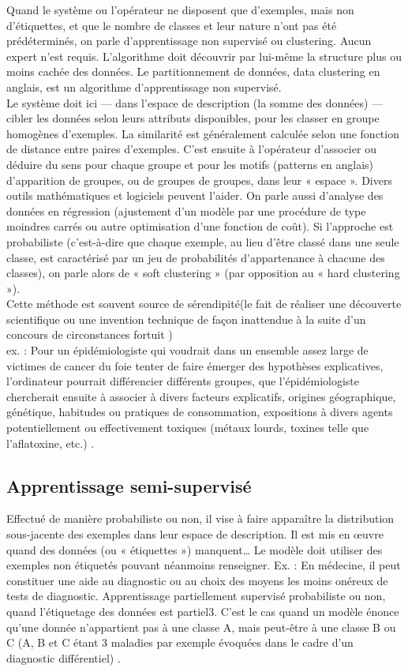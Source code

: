 \documentclass[12pt, french]{report}
\begin{document}
Quand le système ou l'opérateur ne disposent que d'exemples, mais non d'étiquettes, et que le nombre de classes et leur nature n'ont pas été prédéterminés, on parle d'apprentissage non supervisé ou clustering. Aucun expert n'est requis. L'algorithme doit découvrir par lui-même la structure plus ou moins cachée des données. Le partitionnement de données, data clustering en anglais, est un algorithme d'apprentissage non supervisé.\\
Le système doit ici — dans l'espace de description (la somme des données) — cibler les données selon leurs attributs disponibles, pour les classer en groupe homogènes d'exemples. La similarité est généralement calculée selon une fonction de distance entre paires d'exemples. C'est ensuite à l'opérateur d'associer ou déduire du sens pour chaque groupe et pour les motifs (patterns en anglais) d'apparition de groupes, ou de groupes de groupes, dans leur « espace ». Divers outils mathématiques et logiciels peuvent l'aider. On parle aussi d'analyse des données en régression (ajustement d'un modèle par une procédure de type moindres carrés ou autre optimisation d'une fonction de coût). Si l'approche est probabiliste (c'est-à-dire que chaque exemple, au lieu d'être classé dans une seule classe, est caractérisé par un jeu de probabilités d'appartenance à chacune des classes), on parle alors de « soft clustering » (par opposition au « hard clustering »).\\
Cette méthode est souvent source de sérendipité(le fait de réaliser une découverte scientifique ou une invention technique de façon inattendue à la suite d'un concours de circonstances fortuit )\\
ex. : Pour un épidémiologiste qui voudrait dans un ensemble assez large de victimes de cancer du foie tenter de faire émerger des hypothèses explicatives, l'ordinateur pourrait différencier différents groupes, que l'épidémiologiste chercherait ensuite à associer à divers facteurs explicatifs, origines géographique, génétique, habitudes ou pratiques de consommation, expositions à divers agents potentiellement ou effectivement toxiques (métaux lourds, toxines telle que l'aflatoxine, etc.) \cite{key13}.

\subsection{Apprentissage semi-supervisé}
Effectué de manière probabiliste ou non, il vise à faire apparaître la distribution sous-jacente des exemples dans leur espace de description. Il est mis en œuvre quand des données (ou « étiquettes ») manquent… Le modèle doit utiliser des exemples non étiquetés pouvant néanmoins renseigner.
Ex. : En médecine, il peut constituer une aide au diagnostic ou au choix des moyens les moins onéreux de tests de diagnostic.
Apprentissage partiellement supervisé 
probabiliste ou non, quand l'étiquetage des données est partiel3. C'est le cas quand un modèle énonce qu'une donnée n'appartient pas à une classe A, mais peut-être à une classe B ou C (A, B et C étant 3 maladies par exemple évoquées dans le cadre d'un diagnostic différentiel) \cite{key13}.
\end{document}
